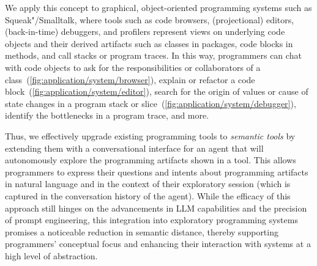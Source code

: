 We apply this concept to graphical, object-oriented programming systems such as Squeak"/Smalltalk, where tools such as code browsers, (projectional) editors, (back-in-time) debuggers, and profilers represent views on underlying code objects and their derived artifacts such as classes in packages, code blocks in methods, and call stacks or program traces.
In this way, programmers can chat with code objects to ask for the responsibilities or collaborators of a class~(\cref{fig:application/system/browser}), explain or refactor a code block~(\cref{fig:application/system/editor}), search for the origin of values or cause of state changes in a program stack or slice~(\cref{fig:application/system/debugger}), identify the bottlenecks in a program trace, and more.

Thus, we effectively upgrade existing programming tools to \emph{semantic tools} by extending them with a conversational interface for an agent that will autonomously explore the programming artifacts shown in a tool.
This allows programmers to express their questions and intents about programming artifacts in natural language and in the context of their exploratory session (which is captured in the conversation history of the agent).
While the efficacy of this approach still hinges on the advancements in LLM capabilities and the precision of prompt engineering, this integration into exploratory programming systems promises a noticeable reduction in semantic distance, thereby supporting programmers' conceptual focus and enhancing their interaction with systems at a high level of abstraction.
